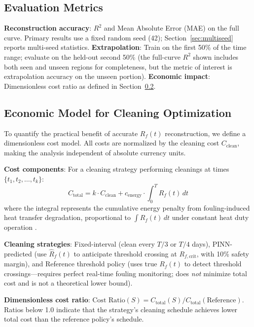 \documentclass[review]{elsarticle}
\begin{document}
\subsection{Evaluation Metrics}

\textbf{Reconstruction accuracy}: $R^2$ and Mean Absolute Error (MAE) on the full curve. Primary results use a fixed random seed (42); Section~\ref{sec:multiseed} reports multi-seed statistics. \textbf{Extrapolation}: Train on the first 50\% of the time range; evaluate on the held-out second 50\% (the full-curve $R^2$ shown includes both seen and unseen regions for completeness, but the metric of interest is extrapolation accuracy on the unseen portion). \textbf{Economic impact}: Dimensionless cost ratio as defined in Section~\ref{sec:economic_model}.

\subsection{Economic Model for Cleaning Optimization}
\label{sec:economic_model}

To quantify the practical benefit of accurate $R_f(t)$ reconstruction, we define a dimensionless cost model. All costs are normalized by the cleaning cost $C_{\text{clean}}$, making the analysis independent of absolute currency units.

\textbf{Cost components}: For a cleaning strategy performing cleanings at times $\{t_1, t_2, \ldots, t_k\}$:
\begin{equation}
C_{\text{total}} = k \cdot C_{\text{clean}} + c_{\text{energy}} \cdot \int_0^T R_f(t) \, dt
\end{equation}
where the integral represents the cumulative energy penalty from fouling-induced heat transfer degradation, proportional to $\int R_f(t) \, dt$ under constant heat duty operation \cite{muller2005fouling}.

\textbf{Cleaning strategies}: Fixed-interval (clean every $T/3$ or $T/4$ days), PINN-predicted (use $\hat{R}_f(t)$ to anticipate threshold crossing at $R_{f,\text{crit}}$, with 10\% safety margin), and Reference threshold policy (uses true $R_f(t)$ to detect threshold crossings---requires perfect real-time fouling monitoring; does \textit{not} minimize total cost and is not a theoretical lower bound).

\textbf{Dimensionless cost ratio}: $\text{Cost Ratio}(S) = C_{\text{total}}(S) / C_{\text{total}}(\text{Reference})$. Ratios below 1.0 indicate that the strategy's cleaning schedule achieves lower total cost than the reference policy's schedule.
\end{document}
